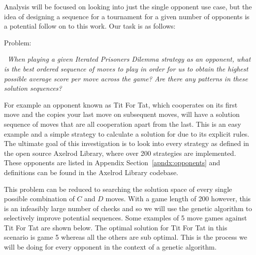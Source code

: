 Analysis will be focused on looking into just the single opponent use case, but the idea of designing a sequence for a tournament for a given number of opponents is a potential follow on to this work.
Our task is as follows:

Problem:
\begin{center}
    \itshape~When playing a given Iterated Prisoners Dilemma strategy as an opponent, what is the best ordered sequence of moves to play in order for us to obtain the highest possible average score per move across the game? Are there any patterns in these solution sequences?
\end{center}

For example an opponent known as Tit For Tat, which cooperates on its first move and the copies your last move on subsequent moves, will have a solution sequence of moves that are all cooperation apart from the last.
This is an easy example and a simple strategy to calculate a solution for due to its explicit rules.
The ultimate goal of this investigation is to look into every strategy as defined in the open source Axelrod Library\cite{axelrodproject}, where over 200 strategies are implemented.
These opponents are listed in Appendix Section~\ref{apndx:opponents} and definitions can be found in the Axelrod Library codebase.

This problem can be reduced to searching the solution space of every single possible combination of $C$ and $D$ moves.
With a game length of 200 however, this is an infeasibly large number of checks and so we will use the genetic algorithm to selectively improve potential sequences. 
Some examples of 5 move games against Tit For Tat are shown below.
The optimal solution for Tit For Tat in this scenario is game 5 whereas all the others are sub optimal.
This is the process we will be doing for every opponent in the context of a genetic algorithm.

